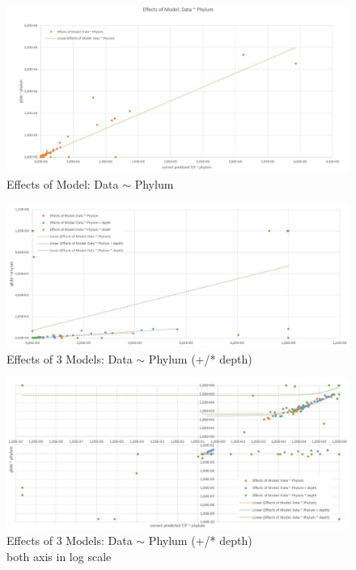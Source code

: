     \begin{figure}[h!]
      \centering
      \includegraphics[trim = 0mm 0mm 0mm 15mm, clip, width=\textwidth]{Figures/EffectsOfModel-Data-Phylum.JPG}
      \caption{Effects of Model: Data $\sim$ Phylum}
      \label{fig:...}
    \end{figure}
    \begin{figure}[h!]
      \centering
      \includegraphics[trim = 0mm 0mm 0mm 0mm, clip, width=\textwidth]{Figures/EffectsOf3Models-Data-Phylum.JPG}
      \caption{Effects of 3 Models: Data $\sim$ Phylum (+/* depth)}
      \label{fig:...}
    \end{figure}
    \begin{figure}[h!]
      \centering
      \includegraphics[trim = 0mm 0mm 0mm 0mm, clip, width=\textwidth]{Figures/EffectsOf3Models-Data-Phylum_loglog.JPG}
      \caption{Effects of 3 Models: Data $\sim$ Phylum (+/* depth) \\ both axis in log scale}
      \label{fig:...}
    \end{figure}

